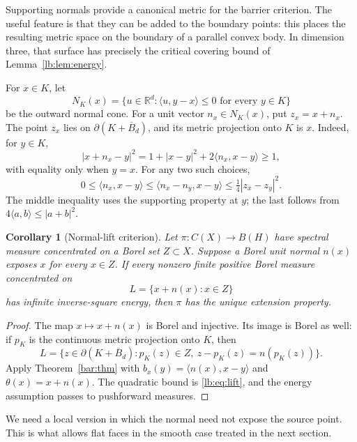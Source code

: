 \documentclass[11pt,letterpaper]{amsart}
\newtheorem{corollary}[theorem]{Corollary}
\theoremstyle{definition}
\theoremstyle{remark}
\numberwithin{equation}{section}
\begin{document}
Supporting normals provide a canonical metric for the barrier
criterion. The useful feature is that they can be added to the
boundary points: this places the resulting metric space on the
boundary of a parallel convex body. In dimension three, that
surface has precisely the critical covering bound of
Lemma~\ref{lb:lem:energy}.

For $x\in K$, let
\[
 N_K(x)=\{u\in\mathbb R^d:
               \langle u,y-x\rangle\le0\text{ for every }y\in K\}
\]
be the outward normal cone. For a unit vector $n_x\in N_K(x)$,
put $z_x=x+n_x$. The point $z_x$ lies on
$\partial(K+\overline B_d)$, and its metric projection onto
$K$ is $x$. Indeed, for $y\in K$,
\[
 |x+n_x-y|^2
 =1+|x-y|^2+2\langle n_x,x-y\rangle\ge1,
\]
with equality only when $y=x$. For any two such choices,
\begin{equation}\label{lb:eq:lift}
 0\le\langle n_x,x-y\rangle
 \le\langle n_x-n_y,x-y\rangle
 \le\tfrac14|z_x-z_y|^2.
\end{equation}
The middle inequality uses the supporting property at $y$;
the last follows from $4\langle a,b\rangle\le|a+b|^2$.

\begin{corollary}[Normal-lift criterion]\label{cap:thm}
Let $\pi:C(X)\to B(H)$ have spectral measure concentrated
on a Borel set $Z\subset X$. Suppose a Borel unit normal
$n(x)$ exposes $x$ for every $x\in Z$. If every nonzero finite
positive Borel measure concentrated on
\[
                        L=\{x+n(x):x\in Z\}
\]
has infinite inverse-square energy, then $\pi$ has the unique
extension property.
\end{corollary}
\begin{proof}
The map $x\mapsto x+n(x)$ is Borel and injective. Its image
is Borel as well: if $p_K$ is the continuous metric projection
onto $K$, then
\[
 L=\{z\in\partial(K+\overline B_d):
        p_K(z)\in Z,\ z-p_K(z)=n(p_K(z))\}.
\]
Apply Theorem~\ref{bar:thm} with
$b_x(y)=\langle n(x),x-y\rangle$ and
$\theta(x)=x+n(x)$. The quadratic bound is
\eqref{lb:eq:lift}, and the energy assumption passes to
pushforward measures.
\end{proof}

We need a local version in which the normal need not expose
the source point. This is what allows flat faces in the smooth
case treated in the next section.
\end{document}
